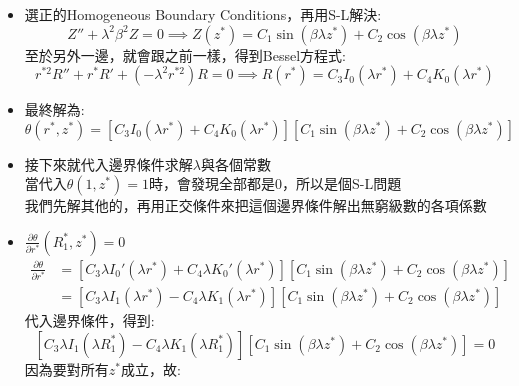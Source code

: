 \documentclass[../main.tex]{subfiles}
\begin{document}
\begin{itemize}
\begin{itemize}
      \item 選正的Homogeneous Boundary Conditions，再用S-L解決:
      \begin{equation}
        Z'' + \lambda^2 \beta^2 Z = 0 \implies Z(z^\ast) = C_1 \sin(\beta \lambda z^\ast) + C_2 \cos(\beta \lambda z^\ast)
      \end{equation}
      至於另外一邊，就會跟之前一樣，得到Bessel方程式:
      \begin{equation}
        r^{\ast 2} R'' + r^\ast R' + \left(-\lambda^2 r^{\ast 2}\right) R = 0 \implies
        R(r^\ast) = C_3 I_0(\lambda r^\ast) + C_4 K_0(\lambda r^\ast)
      \end{equation}
      \item 最終解為:
      \begin{equation}
        \theta(r^\ast, z^\ast) = \left[
          C_3 I_0(\lambda r^\ast) + C_4 K_0(\lambda r^\ast)
        \right] \left[
          C_1 \sin(\beta \lambda z^\ast) + C_2 \cos(\beta \lambda z^\ast)
        \right]
      \end{equation}
      \item 接下來就代入邊界條件求解$\lambda$與各個常數\\
      當代入$\theta(1, z^\ast)=1$時，會發現全部都是0，所以是個S-L問題\\
      我們先解其他的，再用正交條件來把這個邊界條件解出無窮級數的各項係數
      \item $\frac{\partial \theta}{\partial r^\ast}(R_1^\ast,z^\ast) = 0$
      \begin{align}
        \frac{\partial \theta}{\partial r^\ast} &= \left[
          C_3 \lambda I_0'(\lambda r^\ast) + C_4 \lambda K_0'(\lambda r^\ast)
        \right] \left[
          C_1 \sin(\beta \lambda z^\ast) + C_2 \cos(\beta \lambda z^\ast)
        \right] \nonumber\\
        &=\left[
          C_3 \lambda I_1(\lambda r^\ast) - C_4 \lambda K_1(\lambda r^\ast)
        \right] \left[
          C_1 \sin(\beta \lambda z^\ast) + C_2 \cos(\beta \lambda z^\ast)
        \right]
      \end{align}
      代入邊界條件，得到:
      \begin{equation}
        \left[
          C_3 \lambda I_1(\lambda R_1^\ast) - C_4 \lambda K_1(\lambda R_1^\ast)
        \right] \left[
          C_1 \sin(\beta \lambda z^\ast) + C_2 \cos(\beta \lambda z^\ast)
        \right] = 0
      \end{equation}
      因為要對所有$z^\ast$成立，故:
      \begin{equation}

\end{equation}
\end{itemize}
\end{itemize}
\end{document}
